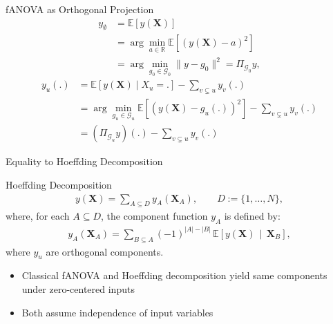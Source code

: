\begin{frame}{fANOVA as Orthogonal Projection} %
\begin{align*}
    y_{\emptyset}
    &= \mathbb{E}[y(\boldsymbol{X})] \\ 
    &= \arg \min_{a \in \mathbb{R}} \mathbb{E}[(y(\boldsymbol{X}) - a)^2] \\ 
    &= \arg \min_{g_0 \in \mathcal{G}_0} \|y - g_0\|^2
    = \Pi_{\mathcal{G}_0}y,
\end{align*}
\begin{align*}
    y_u(.) 
    &= \mathbb{E}[y(\boldsymbol{X}) \mid X_{u} = .] - \sum_{v \subsetneq u} y_v(.) \\ 
    &= \arg \min_{g_u \in \mathcal{G}_u} \mathbb{E}[(y(\boldsymbol{X}) - g_u(.))^2] - \sum_{v \subsetneq u} y_v(.) \\ 
    &= (\Pi_{\mathcal{G}_u}y)(.) - \sum_{v \subsetneq u} y_v(.)
\end{align*}

  
\end{frame}


\begin{frame}{Equality to Hoeffding Decomposition} %
  \begin{block}{Hoeffding Decomposition}
    \begin{align}
    y(\boldsymbol{X})
=
\sum_{A \subseteq D} 
y_A(\boldsymbol{X}_A),
\qquad
D := \{1,\dots,N\},
\end{align}
where, for each $A \subseteq D$, the component function $y_A$ is defined by:
\begin{align}\label{eq:hoeffding_components}
    y_A(\boldsymbol{X}_A)
=
\sum_{B \subseteq A}
(-1)^{|A|-|B|}
\,\mathbb{E}\!\left[
  y(\boldsymbol{X}) 
  \,\middle|\, 
  \boldsymbol{X}_B
\right],
\end{align}
  where $y_u$ are orthogonal components.
  \end{block}
  \begin{itemize}
    \item Classical fANOVA and Hoeffding decomposition yield same components under zero-centered inputs
    \item Both assume independence of input variables
  \end{itemize}
  
\end{frame}

